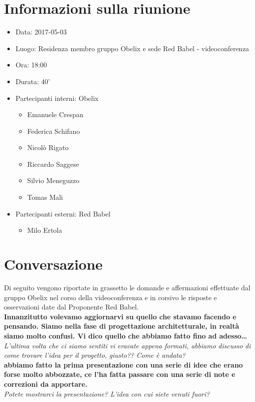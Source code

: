 \documentclass[10 pt,a4paper, openany]{article}
\date{}
\begin{document}
\section{Informazioni sulla riunione}

\begin{itemize}
\item[] Data: 2017-05-03
\item[] Luogo: Residenza membro gruppo Obelix e sede Red Babel - videoconferenza
\item[] Ora: 18:00
\item[] Durata: 40'
\item[] Partecipanti interni: Obelix
  \begin{itemize}
  \item[] Emanuele Crespan
  \item[] Federica Schifano
  \item[] Nicolò Rigato
  \item[] Riccardo Saggese
  \item[] Silvio Meneguzzo
  \item[] Tomas Mali
  \end{itemize}
\item[] Partecipanti esterni: Red Babel
  \begin{itemize}
  \item[] Milo Ertola
  \end{itemize}
\end{itemize}

\section{Conversazione}

Di seguito vengono riportate in grassetto le domande e affermazioni effettuate dal gruppo Obelix
nel corso della videoconferenza e in corsivo le risposte e osservazioni date dal Proponente Red Babel.\\

\textbf{Innanzitutto volevamo aggiornarvi su quello che stavamo facendo e pensando. Siamo nella fase di progettazione architetturale, in realtà siamo molto confusi. 
Vi dico quello che abbiamo fatto fino ad adesso…}\\
\textit{L’ultima volta che ci siamo sentiti vi eravate appena formati, abbiamo discusso di come trovare l’idea per il progetto, giusto?? Come è andata?
}\\

\textbf{abbiamo fatto la prima presentazione con una serie di idee che erano forse molto abbozzate, ce l’ha fatta passare con una serie di note e correzioni da apportare.}\\
\textit{Potete mostrarci la presentazione?
L’idea con cui siete venuti fuori?}\\
\end{document}
